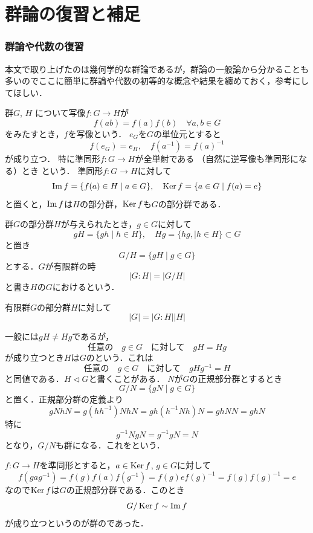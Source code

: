 
\chapter{群論の復習と補足}\label{appa:groupTheory}
\subsection{群論や代数の復習}
本文で取り上げたのは幾何学的な群論であるが，群論の一般論から分かることも多いのでここに簡単に群論や代数の初等的な概念や結果を纏めておく，参考にしてほしい．


群$G$, $H$ について写像$f:G\to H$が
\[
     f(ab)=f(a)f(b)\quad \forall a,b\in G
\]
をみたすとき，$f$を写像という．
$e_G$を$G$の単位元とすると
\[
     f(e_G)=e_H, \quad f(a^{-1})=f(a)^{-1} 
\]
が成り立つ．
特に準同形$f:G\to H$が全単射である
（自然に逆写像も準同形になる）とき
という．
準同形$f:G\to H$に対して
\[
     \operatorname{Im} f =\{f(a)\in H\mid a\in G\},\quad
      \operatorname{Ker} f=\{a\in G\mid f(a)=e\}
 \]
 と置くと，$\operatorname{Im} f$は$H$の部分群，$\operatorname{Ker} f$も$G$の部分群である．

群$G$の部分群$H$が与えられたとき，$g\in G$に対して
\[
     gH=\{gh\mid h\in H\},\quad Hg=\{hg,\mid h\in H\}
     \subset G
\]
と置き
\[
     G/H = \{gH\mid g\in G\}
\]
とする．$G$が有限群の時
\[
     |G : H|= |G/H|
\]
と書き$H$の$G$におけるという．
\begin{Thm}
   有限群$G$の部分群$H$に対して
   \[
        |G| =|G : H| |H|
   \]
\end{Thm}

一般には$gH\neq Hg$であるが，
\[
     \text{任意の}\quad g\in G\quad\text{に対して}\quad gH= Hg
\]
が成り立つとき$H$は$G$のという．これは
\[
     \text{任意の}\quad g\in G\quad\text{に対して}\quad gHg^{-1}= H
\]
と同値である．$H\lhd G$と書くことがある．
$N$が$G$の正規部分群とするとき
\[
     G/N = \{gN\mid g\in G\}
\]
と置く．正規部分群の定義より
\[
     gNhN
     =g(hh^{-1})NhN
     =gh(h^{-1}Nh)N=gh NN =gh N
\]
特に
\[
     g^{-1}NgN=g^{-1}gN=N
\]
となり，$G/N$も群になる．これをという．%

$f:G\to H$を準同形とすると，$a\in\operatorname{Ker} f$,  $g\in G$に対して
\[
     f(gag^{-1})=f(g)f(a)f(g^{-1})=f(g)ef(g)^{-1}=f(g)f(g)^{-1}=e
\]
なので$\operatorname{Ker} f$は$G$の正規部分群である．このとき
\[
     G/\operatorname{Ker} f\sim \operatorname{Im} f
\]
が成り立つというのが群のであった．
\emptyline

